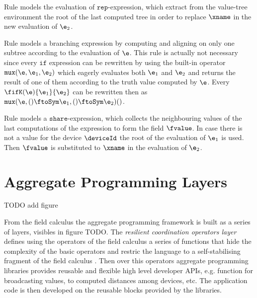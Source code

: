 Rule  models the evaluation of $\mathtt{rep}$-expression, which extract from the value-tree environment the root of the last computed tree in order to replace $\xname$ in the new evaluation of $\e_2$.

Rule  models a branching expression by computing and aligning on only one subtree according to the evaluation of $\e$. This rule is actually not necessary since every $\mathtt{if}$ expression can be rewritten by using the built-in operator $\mathtt{mux}(\e,\e_1,\e_2)$ which eagerly evaluates both $\e_1$ and $\e_2$ and returns the result of one of them according to the truth value computed by $\e$. Every $\fifK(\e)\{\e_1\}\{\e_2\}$ can be rewritten then as $\mathtt{mux}(\e,()\ftoSym\e_1,()\ftoSym\e_2)()$.

Rule  models a $\mathtt{share}$-expression, which collects the neighbouring values of the last computations of the expression to form the field $\fvalue$. In case there is not a value for the device $\deviceId$ the root of the evaluation of $\e_1$ is used. Then $\fvalue$ is substituted to $\xname$ in the evaluation of $\e_2$.

\section{Aggregate Programming Layers}

TODO add figure

From the field calculus the aggregate programming framework is built as a series of layers, visibles in figure TODO. The \textit{resilient coordination operators layer} defines using the operators of the field calculus a series of functions that hide the complexity of the basic operators and restric the language to a self-stabilising fragment  of the field calculus \cite{SelfStabilizing}. Then over this operators aggregate programming libraries provides reusable and flexible high level developer APIs, e.g. function for broadcasting values, to computed distances among devices, etc. The application code is then developed on the reusable blocks provided by the libraries.

